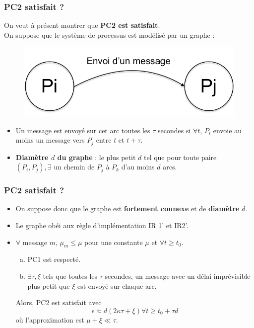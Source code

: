 \documentclass[compress]{beamer}
\begin{document}
\begin{frame}
\frametitle{PC2 satisfait ?}
On veut à présent montrer que \textbf{\color{cyan}PC2 est satisfait}.\\
On suppose que le système de processus est modélisé par un graphe :
\begin{figure}
	\includegraphics[scale=0.2]{process_graph.png}
\end{figure}
\begin{itemize}
\item Un message est envoyé sur cet arc toutes les $\tau$ secondes si $\forall t$, $P_i$ envoie au moins un message vers $P_j$ entre $t$ et $t+\tau$.
\item \textbf{\color{cyan}Diamètre $d$ du graphe} : le plus petit $d$ tel que pour toute paire $(P_i, P_j), \exists$ un chemin de $P_j$ à $P_k$ d'au moins $d$ arcs.
\end{itemize}
\end{frame}

\begin{frame}
\frametitle{PC2 satisfait ?}
\begin{itemize}
\item On suppose donc que le graphe est \textbf{fortement connexe} et de \textbf{diamètre} $d$.
\item Le graphe obéi aux règle d'implémentation IR 1' et IR2'.
\item $\forall$ message $m$, $\mu_m \leq \mu$ pour une constante $\mu$ et $\forall t \geq t_0$.
	\begin{enumerate}[(a)]
	\item PC1 est respecté.
	\item $\exists \tau, \xi$ tels que toutes les $\tau$ secondes, un message avec un délai imprévisible plus petit que $\xi$ est envoyé sur chaque arc.
	\end{enumerate}
	Alors, PC2 est satisfait avec 
	\[\epsilon \approx d(2 \kappa \tau + \xi) \forall t \geq t_0+\tau d\]
	où l'approximation est $\mu + \xi \ll \tau$.
\end{itemize}
\end{frame}
\end{document}
